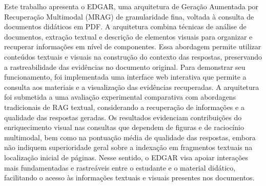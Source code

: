 Este trabalho apresenta o EDGAR, uma arquitetura de Geração Aumentada por Recuperação Multimodal (MRAG) de granularidade fina, voltada à consulta de documentos didáticos em PDF. A arquitetura combina técnicas de análise de documentos, extração textual e descrição de elementos visuais para organizar e recuperar informações em nível de componentes. Essa abordagem permite utilizar conteúdos textuais e visuais na construção do contexto das respostas, preservando a rastreabilidade das evidências no documento original. Para demonstrar seu funcionamento, foi implementada uma interface web interativa que permite a consulta aos materiais e a visualização das evidências recuperadas. A arquitetura foi submetida a uma avaliação experimental comparativa com abordagens tradicionais de RAG textual, considerando a recuperação de informações e a qualidade das respostas geradas. Os resultados evidenciam contribuições do enriquecimento visual nas consultas que dependem de figuras e de raciocínio multimodal, bem como na pontuação média de qualidade das respostas, embora não indiquem superioridade geral sobre a indexação em fragmentos textuais na localização inicial de páginas. Nesse sentido, o EDGAR visa apoiar interações mais fundamentadas e rastreáveis entre o estudante e o material didático, facilitando o acesso às informações textuais e visuais presentes nos documentos.

